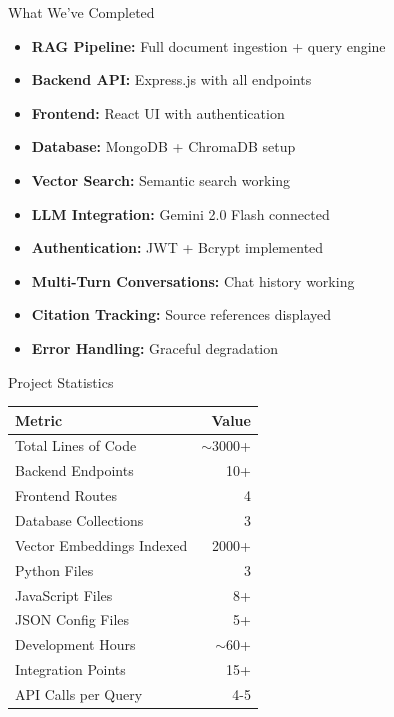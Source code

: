 \documentclass[11pt,aspectratio=16:9]{beamer}
\begin{document}
\begin{frame}{What We've Completed}
    \begin{itemize}
        \item [+] \textbf{RAG Pipeline:} Full document ingestion + query engine
        \item [+] \textbf{Backend API:} Express.js with all endpoints
        \item [+] \textbf{Frontend:} React UI with authentication
        \item [+] \textbf{Database:} MongoDB + ChromaDB setup
        \item [+] \textbf{Vector Search:} Semantic search working
        \item [+] \textbf{LLM Integration:} Gemini 2.0 Flash connected
        \item [+] \textbf{Authentication:} JWT + Bcrypt implemented
        \item [+] \textbf{Multi-Turn Conversations:} Chat history working
        \item [+] \textbf{Citation Tracking:} Source references displayed
        \item [+] \textbf{Error Handling:} Graceful degradation
    \end{itemize}
\end{frame}

\begin{frame}{Project Statistics}
    \begin{center}
        \begin{tabular}{|l|r|}
            \hline
            \textbf{Metric} & \textbf{Value} \\
            \hline
            Total Lines of Code & $\sim$3000+ \\
            Backend Endpoints & 10+ \\
            Frontend Routes & 4 \\
            Database Collections & 3 \\
            Vector Embeddings Indexed & 2000+ \\
            \hline
            Python Files & 3 \\
            JavaScript Files & 8+ \\
            JSON Config Files & 5+ \\
            \hline
            Development Hours & $\sim$60+ \\
            Integration Points & 15+ \\
            API Calls per Query & 4-5 \\
            \hline
        \end{tabular}
    \end{center}
\end{frame}
\end{document}
